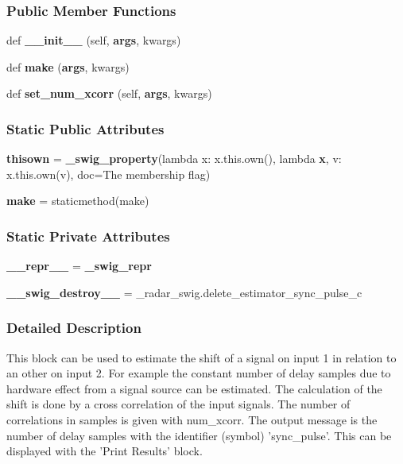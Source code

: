 \subsubsection*{Public Member Functions}
\begin{DoxyCompactItemize}
\item 
def {\bf \+\_\+\+\_\+init\+\_\+\+\_\+} (self, {\bf args}, kwargs)
\item 
def {\bf make} ({\bf args}, kwargs)
\item 
def {\bf set\+\_\+num\+\_\+xcorr} (self, {\bf args}, kwargs)
\end{DoxyCompactItemize}
\subsubsection*{Static Public Attributes}
\begin{DoxyCompactItemize}
\item 
{\bf thisown} = {\bf \+\_\+swig\+\_\+property}(lambda x\+: x.\+this.\+own(), lambda {\bf x}, v\+: x.\+this.\+own(v), doc=\textquotesingle{}The membership flag\textquotesingle{})
\item 
{\bf make} = staticmethod(make)
\end{DoxyCompactItemize}
\subsubsection*{Static Private Attributes}
\begin{DoxyCompactItemize}
\item 
{\bf \+\_\+\+\_\+repr\+\_\+\+\_\+} = {\bf \+\_\+swig\+\_\+repr}
\item 
{\bf \+\_\+\+\_\+swig\+\_\+destroy\+\_\+\+\_\+} = \+\_\+radar\+\_\+swig.\+delete\+\_\+estimator\+\_\+sync\+\_\+pulse\+\_\+c
\end{DoxyCompactItemize}


\subsubsection{Detailed Description}
\begin{DoxyVerb}This block can be used to estimate the shift of a signal on input 1 in relation to an other on input 2. For example the constant number of delay samples due to hardware effect from a signal source can be estimated. The calculation of the shift is done by a cross correlation of the input signals. The number of correlations in samples is given with num_xcorr. The output message is the number of delay samples with the identifier (symbol) 'sync_pulse'. This can be displayed with the 'Print Results' block.\end{DoxyVerb}
 

